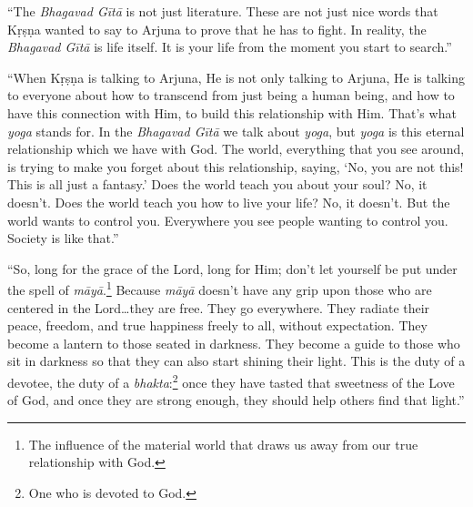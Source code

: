 \enquote{The \textit{Bhagavad Gītā} is not just literature. These are not just nice words that Kṛṣṇa wanted to say to Arjuna to prove that he has to fight. In reality, the \textit{Bhagavad Gītā} is life itself. It is your life from the moment you start to search.}

\enquote{When Kṛṣṇa is talking to Arjuna, He is not only talking to Arjuna, He is talking to everyone about how to transcend from just being a human being, and how to have this connection with Him, to build this relationship with Him. That’s what \textit{yoga} stands for. In the \textit{Bhagavad Gītā} we talk about \textit{yoga}, but \textit{yoga} is this eternal relationship which we have with God. The world, everything that you see around, is trying to make you forget about this relationship, saying, \enquote{No, you are not this! This is all just a fantasy.} Does the world teach you about your soul? No, it doesn’t. Does the world teach you how to live your life? No, it doesn’t. But the world wants to control you. Everywhere you see people wanting to control you. Society is like that.}



\enquote{So, long for the grace of the Lord, long for Him; don’t let yourself be put under the spell of \textit{māyā}.\footnote{The influence of the material world that draws us away from our true relationship with God.} Because \textit{māyā} doesn’t have any grip upon those who are centered in the Lord\ldots they are free. They go everywhere. They radiate their peace, freedom, and true happiness freely to all, without expectation. They become a lantern to those seated in darkness. They become a guide to those who sit in darkness so that they can also start shining their light. This is the duty of a devotee, the duty of a \textit{bhakta}:\footnote{One who is devoted to God.} once they have tasted that sweetness of the Love of God, and once they are strong enough, they should help others find that light.}
